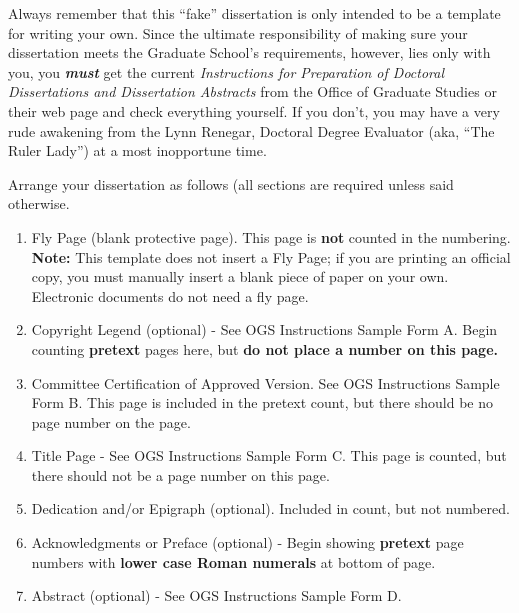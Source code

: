 Always remember that this ``fake'' dissertation 
%
is only intended to be a template for writing your own. Since the ultimate
responsibility of making sure your dissertation meets the Graduate School's
requirements, however, lies only with you, you \textbf{\textit{must}} get
the current \emph{Instructions for Preparation of Doctoral Dissertations and
Dissertation Abstracts} from the Office of Graduate Studies or their web
page and check everything yourself. If you don't, you may have a very
rude awakening from the Lynn Renegar, Doctoral Degree Evaluator (aka,
``The Ruler Lady'') at a most inopportune time.

Arrange your dissertation as follows (all sections are required 
unless said otherwise.

\begin{enumerate}

\item Fly Page 
%
(blank protective page). This page is \textbf{not} counted in the numbering.
\textbf{Note:} This template does not insert a Fly Page; if you are printing
an official copy, you must manually insert a blank piece of paper on your own.
Electronic documents do not need a fly page.

\item Copyright Legend 
%
(optional) - See OGS Instructions Sample Form A.
Begin counting \textbf{pretext} pages here, but \textbf{do not
place a number on this page.} 

\item Committee Certification of Approved Version.
%
See OGS Instructions Sample Form B. This page is included in the
pretext count, but there should be no page number on the page.

\item Title Page - 
%
See OGS Instructions Sample Form C.
This page is counted, but there should not be a page number on this page.

\item Dedication 
%
and/or Epigraph (optional). 
%
Included in count, but not numbered.

\item Acknowledgments
%
or Preface 
%
(optional) - Begin showing \textbf{pretext} page numbers with \textbf{lower
case Roman numerals} at bottom of page.

\item Abstract 
%
(optional) - See OGS Instructions Sample Form D.


\end{enumerate}
